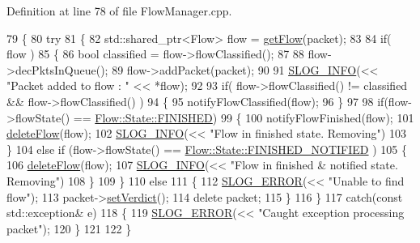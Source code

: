 Definition at line 78 of file Flow\-Manager.\-cpp.


\begin{DoxyCode}
79 \{
80     \textcolor{keywordflow}{try}
81     \{
82         std::shared\_ptr<Flow> flow = \hyperlink{class_vsid_common_1_1_flow_manager_ad8e2576a43951a72d71b5cb9827e80e3}{getFlow}(packet);
83 
84         \textcolor{keywordflow}{if}( flow )
85         \{
86             \textcolor{keywordtype}{bool} classified = flow->flowClassified();
87 
88             flow->decPktsInQueue();
89             flow->addPacket(packet);
90 
91             \hyperlink{_logger_8h_a119c1c29ba35a8db38e2358e41167282}{SLOG\_INFO}(<< \textcolor{stringliteral}{"Packet added to flow : "} << *flow);  
92 
93             \textcolor{keywordflow}{if}( flow->flowClassified() != classified && flow->flowClassified() )
94             \{
95                 notifyFlowClassified(flow);
96             \}
97 
98             \textcolor{keywordflow}{if}(flow->flowState() == \hyperlink{class_vsid_common_1_1_flow_a4c78d7517903031a861c7287e706a6c2a2c616b2713e2e0aed04b4c4752c88133}{Flow::State::FINISHED})
99             \{
100                 notifyFlowFinished(flow);
101                 \hyperlink{class_vsid_common_1_1_flow_manager_a5e3d398ded3ad62f8677cab1515f5c4e}{deleteFlow}(flow);
102                 \hyperlink{_logger_8h_a119c1c29ba35a8db38e2358e41167282}{SLOG\_INFO}(<< \textcolor{stringliteral}{"Flow in finished state. Removing"})
103             \}
104             \textcolor{keywordflow}{else} \textcolor{keywordflow}{if} (flow->flowState() == \hyperlink{class_vsid_common_1_1_flow_a4c78d7517903031a861c7287e706a6c2a055b500bb0ed82a58f138a885208507a}{Flow::State::FINISHED\_NOTIFIED} )
105             \{
106                 \hyperlink{class_vsid_common_1_1_flow_manager_a5e3d398ded3ad62f8677cab1515f5c4e}{deleteFlow}(flow);
107                 \hyperlink{_logger_8h_a119c1c29ba35a8db38e2358e41167282}{SLOG\_INFO}(<< \textcolor{stringliteral}{"Flow in finished & notified state. Removing"})
108             \}
109         \}
110         \textcolor{keywordflow}{else}
111         \{
112             \hyperlink{_logger_8h_a2a8694cd392d18f4db6b9cc9f15bafe3}{SLOG\_ERROR}(<< \textcolor{stringliteral}{"Unable to find flow"});
113             packet->\hyperlink{class_vsid_common_1_1_i_pv4_packet_ae314f9e085588928d3c260211f80da87}{setVerdict}();
114             \textcolor{keyword}{delete} packet;
115         \}
116     \}
117     \textcolor{keywordflow}{catch}(\textcolor{keyword}{const} std::exception& e)
118     \{
119         \hyperlink{_logger_8h_a2a8694cd392d18f4db6b9cc9f15bafe3}{SLOG\_ERROR}(<< \textcolor{stringliteral}{"Caught exception processing packet"});
120     \}
121     
122 \}
\end{DoxyCode}


